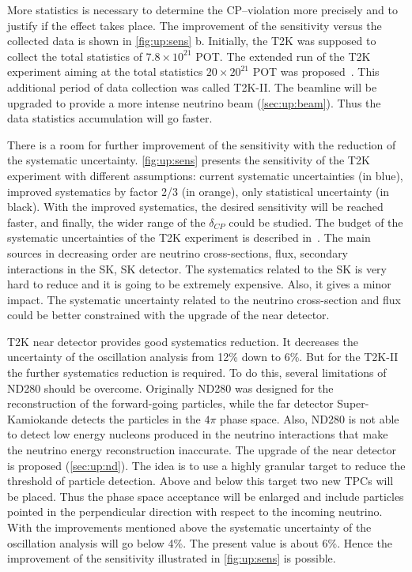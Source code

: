 \documentclass[../main.tex]{subfiles}
\begin{document}
More statistics is necessary to determine the CP--violation more precisely and to justify if the effect takes place. The improvement of the sensitivity versus the collected data is shown in \autoref{fig:up:sens} b. Initially, the T2K was supposed to collect the total statistics of $7.8\times10^{21}$ POT. The extended run of the T2K experiment aiming at the total statistics $20\times20^{21}$ POT was proposed~\cite{Abe2016e}. This additional period of data collection was called T2K-II. The beamline will be upgraded to provide a more intense neutrino beam (\autoref{sec:up:beam}). Thus the data statistics accumulation will go faster.

There is a room for further improvement of the sensitivity with the reduction of the systematic uncertainty. \autoref{fig:up:sens} presents the sensitivity of the T2K experiment with different assumptions: current systematic uncertainties (in blue), improved systematics by factor 2/3 (in orange), only statistical uncertainty (in black). With the improved systematics, the desired sensitivity will be reached faster, and finally, the wider range of the $\delta_{CP}$ could be studied. The budget of the systematic uncertainties of the T2K experiment is described in~\cite{Abe2017}. The main sources in decreasing order are neutrino cross-sections, flux, secondary interactions in the SK, SK detector. The systematics related to the SK is very hard to reduce and it is going to be extremely expensive. Also, it gives a minor impact. The systematic uncertainty related to the neutrino cross-section and flux could be better constrained with the upgrade of the near detector.

T2K near detector provides good systematics reduction. It decreases the uncertainty of the oscillation analysis from 12\% down to 6\%. But for the T2K-II the further systematics reduction is required. To do this, several limitations of ND280 should be overcome. Originally ND280 was designed for the reconstruction of the forward-going particles, while the far detector Super-Kamiokande detects the particles in the $4\pi$ phase space. Also, ND280 is not able to detect low energy nucleons produced in the neutrino interactions that make the neutrino energy reconstruction inaccurate. The upgrade of the near detector is proposed (\autoref{sec:up:nd}). The idea is to use a highly granular target to reduce the threshold of particle detection. Above and below this target two new TPCs will be placed. Thus the phase space acceptance will be enlarged and include particles pointed in the perpendicular direction with respect to the incoming neutrino. With the improvements mentioned above the systematic uncertainty of the oscillation analysis will go below 4\%. The present value is about 6\%. Hence the improvement of the sensitivity illustrated in \autoref{fig:up:sens} is possible.
\end{document}
